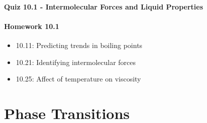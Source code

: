 \documentclass[12pt, openany, letterpaper]{memoir}
\begin{document}
\paragraph*{Quiz 10.1 - Intermolecular Forces and Liquid Properties}
\paragraph*{Homework 10.1}
\begin{itemize}
  \item 10.11: Predicting trends in boiling points
  \item 10.21: Identifying intermolecular forces
  \item 10.25: Affect of temperature on viscosity
\end{itemize}

\section{Phase Transitions}
\end{document}
